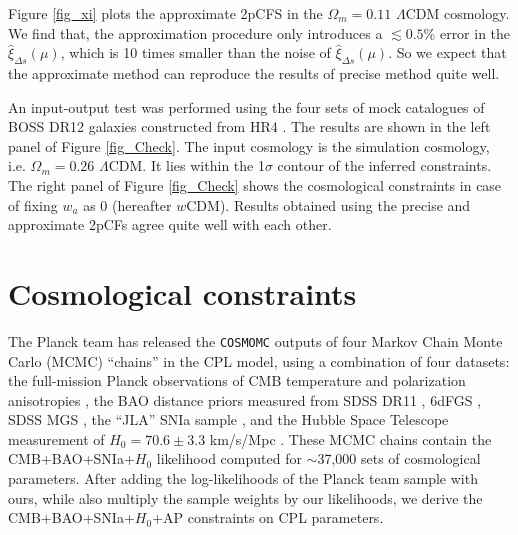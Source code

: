\documentclass[iop]{emulateapj}
\begin{document}

Figure \ref{fig_xi} plots the approximate 2pCFS in the $\Omega_m=0.11$ $\Lambda$CDM cosmology.
We find that, the approximation procedure only introduces a $\lesssim0.5\%$ error in the $\hat\xi_{\Delta s}(\mu)$, 
which is 10 times smaller than the noise of $\hat\xi_{\Delta s}(\mu)$.
So we expect that the approximate method can reproduce the results of precise method quite well.


An input-output test was performed using the four sets of mock catalogues of BOSS DR12 galaxies constructed from HR4 \citep{HR4}.
The results are shown in the left panel of Figure \ref{fig_Check}. 
The input cosmology is the simulation cosmology, i.e. $\Omega_m=0.26$ $\Lambda$CDM.
It lies within the 1$\sigma$ contour of the inferred constraints.
The right panel of Figure \ref{fig_Check} shows the cosmological constraints in case of fixing $w_a$ as 0 (hereafter $w$CDM).
Results obtained using the precise and approximate 2pCFs agree quite well with each other.





\section{Cosmological constraints}


The Planck team has released the {\texttt {COSMOMC}} \citep{LB2002} outputs of four Markov Chain Monte Carlo (MCMC) 
``chains'' in the CPL model, 
using a combination of four datasets:
the full-mission Planck observations of CMB temperature and polarization anisotropies \citep{Planck2015},
the BAO distance priors measured from SDSS DR11 \citep{Anderson2013}, 6dFGS \citep{6dFGS}, SDSS MGS \citep{MGS},
the ``JLA'' SNIa sample \citep{JLA},
and the Hubble Space Telescope measurement of $H_0=70.6\pm3.3$ km/s/Mpc \citep{Riess2011,E14H0}.
These MCMC chains contain the CMB+BAO+SNIa+$H_0$ likelihood computed for $\sim$37,000 sets of cosmological parameters.
After adding the log-likelihoods of the Planck team sample with ours, 
while also multiply the sample weights by our likelihoods, 
we derive the CMB+BAO+SNIa+$H_0$+AP constraints on CPL parameters. %
\end{document}
